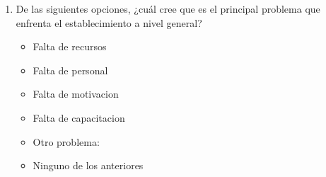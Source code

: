 \documentclass{article}
\begin{document}
\begin{enumerate}[leftmargin=*, label=\arabic*.]
        \underline{\hspace{0.95\linewidth}} \vspace{0.3cm}
        \item De las siguientes opciones, ¿cuál cree que es el principal problema que enfrenta el establecimiento a nivel general?
        \begin{itemize}[label=$\square$]
            \item Falta de recursos
            \item Falta de personal
            \item Falta de motivacion
            \item Falta de capacitacion
            \item Otro problema: \underline{\hspace{0.5\linewidth}}
            \item Ninguno de los anteriores
        \end{itemize}
\end{enumerate}
\end{document}
